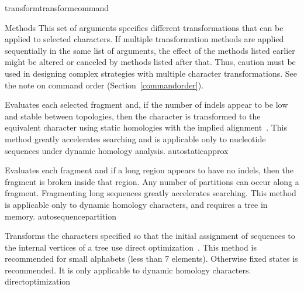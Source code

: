 \begin{command}{transform}{transformcommand}
\begin{arguments}
        \begin{argumentgroup}{Methods}
            This set of arguments specifies different transformations that can be applied
            to selected characters. If multiple transformation methods are applied
            sequentially in the same list of arguments, the effect of the methods listed
            earlier might be altered or canceled by methods listed after that. Thus, caution
            must be used in designing complex strategies with multiple character
            transformations. See the note on command order (Section~\ref{commandorder}).

            {Evaluates each selected fragment and, if the number of indels
            appear to be low and stable between topologies, then the character
            is transformed to the equivalent character using static homologies
            with the implied alignment~\cite{wheeler2003}.
            This method greatly accelerates searching and is applicable only to nucleotide sequences under dynamic homology analysis.}
            {autostaticapprox}

            {Evaluates each fragment and if a long region appears 
            to have no indels, then the fragment is broken inside that region.
            Any number of partitions can occur along a fragment. Fragmenting
            long sequences greatly accelerates searching. This method is
            applicable only to dynamic homology characters, and requires a tree
            in memory.}
            {autosequencepartition}
            
          {Transforms the characters specified so that the initial assignment of sequences to 
          the internal vertices of a tree use direct
          optimization~\cite{wheeler1996}. This method is recommended for small
          alphabets (less than 7 elements). Otherwise fixed states is
          recommended. It is only applicable to dynamic homology
          characters.}
          {directoptimization}


\end{argumentgroup}
\end{arguments}
\end{command}
